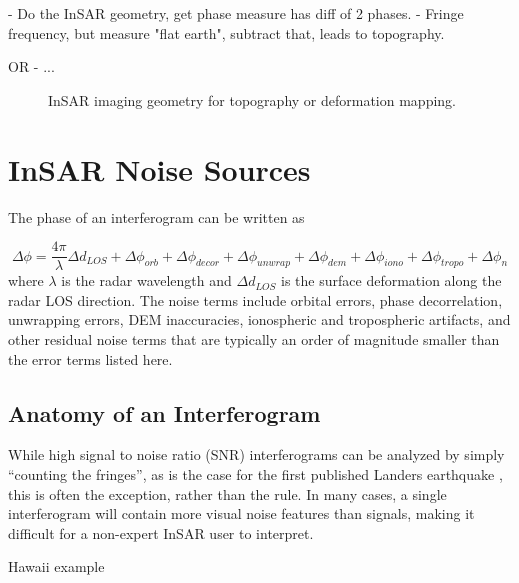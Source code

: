 - Do the InSAR geometry, get phase measure has diff of 2 phases.
- Fringe frequency, but measure "flat earth", subtract that, leads to topography.

OR
- ...


\begin{figure}[hbt!]
	\centering
	\caption{InSAR imaging geometry for topography or deformation mapping.
	}
	\label{fig:ch3-insar-geometry}
\end{figure}




\section{InSAR Noise Sources}
\label{sec:ch3-noise}

The phase of an interferogram can be written as

\citep{Zebker1992DecorrelationInterferometricRadar, Zebker1994AccuracyTopographicMaps, Zebker1997AtmosphericEffectsInterferometric}
\begin{equation}
	\Delta \phi = \frac{4 \pi}{\lambda} \Delta d_{LOS} +  \Delta \phi_{orb} + \Delta \phi_{decor} + \Delta \phi_{unwrap}  + \Delta \phi_{dem} + \Delta \phi_{iono} + \Delta \phi_{tropo}  + \Delta \phi_{n}
\end{equation}
where $ \lambda $ is the radar wavelength and $ \Delta d_{LOS} $ is the surface deformation along the radar LOS direction. The noise terms include orbital errors, phase decorrelation, unwrapping errors, DEM inaccuracies, ionospheric and tropospheric artifacts, and other residual noise terms that are typically an order of magnitude smaller than the error terms listed here.


\subsection{Anatomy of an Interferogram}

While high signal to noise ratio (SNR) interferograms can be analyzed by simply ``counting the fringes'', as is the case for the first published Landers earthquake \cite{Massonnet1993DisplacementFieldLanders}, this is often the exception, rather than the rule.
In many cases, a single interferogram will contain more visual noise features than signals, making it difficult for a non-expert InSAR user to interpret. 

Hawaii example




